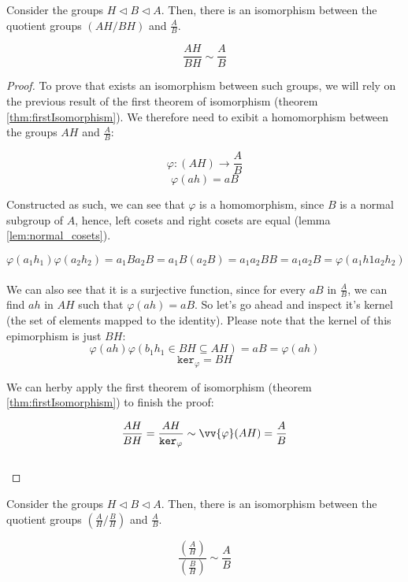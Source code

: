 \begin{theorem}
\label{thm:secondIsomorphism}
    Consider the groups $H \triangleleft B \triangleleft A$. Then, there is an 
    isomorphism between the quotient groups $(AH/BH)$ and $\frac{A}{B}$.

    $$ \frac{AH}{BH} \sim \frac{A}{B} $$ \vspace{0.2em}
\end{theorem}
\begin{proof}
    To prove that exists an isomorphism between such groups, we will rely on the previous 
    result of the first theorem of isomorphism (theorem \ref{thm:firstIsomorphism}). We 
    therefore need to exibit a homomorphism between the groups $AH$ and $\frac{A}{B}$:


    $$ \varphi : (AH) \rightarrow \frac{A}{B} $$
    $$ \varphi(ah) = aB $$ \vspace{0.2em}

    Constructed as such, we can see that $\varphi$ is a homomorphism, since $B$ is a normal subgroup 
    of $A$, hence, left cosets and right cosets are equal (lemma \ref{lem:normal_cosets}).

    $$ \varphi(a_1h_1)\varphi(a_2h_2) = a_1Ba_2B = a_1B(a_2B) = a_1a_2BB = a_1a_2B = \varphi(a_1h1a_2h_2) $$ \\

    We can also see that it is a surjective function, since for every $aB$ in $\frac{A}{B}$,
    we can find $ah$ in $AH$ such that $\varphi(ah) = aB$. So let's go ahead and inspect 
    it's kernel (the set of elements mapped to the identity). Please note that the kernel 
    of this epimorphism is just $BH$: \\

    $$ \varphi(ah)\varphi(b_1h_1 \in BH \subseteq AH) = aB = \varphi(ah) $$
    $$ \texttt{ker}_{\varphi} = BH $$

    We can herby apply the first theorem of isomorphism (theorem \ref{thm:firstIsomorphism}) to
    finish the proof:

    $$ \frac{AH}{BH} = \frac{AH}{\texttt{ker}_{\varphi}} \sim \vv{\varphi}(AH) = \frac{A}{B} $$ \\

\end{proof} \vspace{0.2em}

\newpage

\begin{theorem}
\label{thm:thirdIsomorphism}
    Consider the groups $H \triangleleft B \triangleleft A$. Then, there is an 
    isomorphism between the quotient groups $(\frac{A}{H}/\frac{B}{H})$ and $\frac{A}{B}$.

    $$ \frac{(\frac{A}{H})}{(\frac{B}{H})} \sim \frac{A}{B} $$ \vspace{0.2em}
\end{theorem}
\vspace{0.2em}


